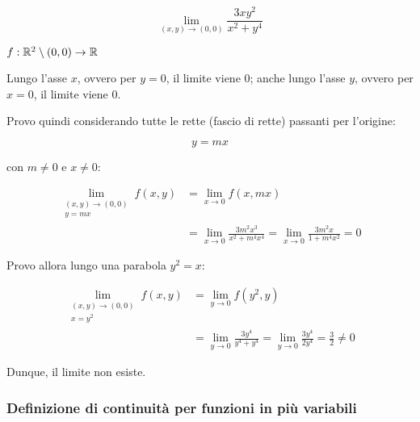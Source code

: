 \[
    \lim_{ (x,y) \to (0,0) } \frac{3xy^{2}}{x^{2}+y^{4}}
\]

\(f:\mathbb{R}^{2}\setminus (0,0) \rightarrow \mathbb{R} \)

Lungo l'asse \(x\), ovvero per \(y=0\), il limite viene 0; anche lungo l'asse \(y\), ovvero per \(x=0\), il limite viene 0.

Provo quindi considerando tutte le rette (fascio di rette) passanti per l'origine:

\[
    y= mx
\]

con \(m \neq 0\) e \(x \neq 0\):

\begin{align*}
    \lim_{\begin{smallmatrix} (x,y) \to (0,0) \\ y=mx \end{smallmatrix}} f(x,y) & = \lim_{ x \to 0 } f(x,mx)                                                                  \\
                                                                                & = \lim_{ x \to 0 } \frac{3m^2x^3}{x^2+m^4x^4} = \lim_{ x \to 0 } \frac{3m^2x}{1+m^4x^2} = 0
\end{align*}

Provo allora lungo una parabola \(y^{2}=x\):

\begin{align*}
    \lim_{\begin{smallmatrix} (x,y) \to (0,0) \\ x=y^{2} \end{smallmatrix}} f(x,y) & = \lim_{ y \to 0 } f(y^{2},y)                                                                                    \\
                                                                                   & = \lim_{ y \to 0 } \frac{3y^{4}}{y^{4}+y^{4}} = \lim_{ y \to 0 } \frac{3y^{4}}{2y^{4}}      = \frac{3}{2} \neq 0
\end{align*}

Dunque, il limite non esiste.

\pagebreak

\subsubsection{Definizione di continuità per funzioni in più variabili}


